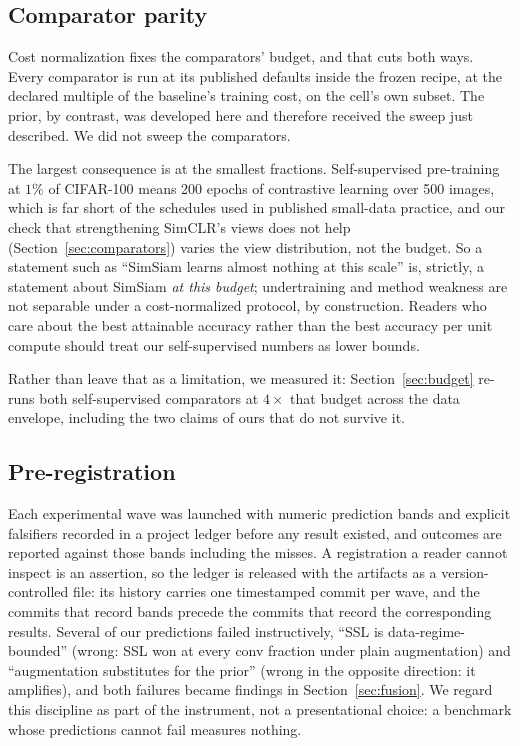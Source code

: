 \subsection{Comparator parity}\label{sec:parity}
Cost normalization fixes the comparators' budget, and that cuts both ways.
Every comparator is run at its published defaults inside the frozen recipe,
at the declared multiple of the baseline's training cost, on the cell's own
subset. The prior, by contrast, was developed here and therefore received
the sweep just described. We did not sweep the comparators.

The largest consequence is at the smallest fractions. Self-supervised
pre-training at $1\%$ of CIFAR-100 means 200 epochs of contrastive learning
over 500 images, which is far short of the schedules used in published
small-data practice, and our check that strengthening SimCLR's views does
not help (Section~\ref{sec:comparators}) varies the view distribution, not
the budget. So a statement such as ``SimSiam learns almost nothing at this
scale'' is, strictly, a statement about SimSiam \emph{at this budget};
undertraining and method weakness are not separable under a cost-normalized
protocol, by construction. Readers who care about the best attainable
accuracy rather than the best accuracy per unit compute should treat our
self-supervised numbers as lower bounds.

Rather than leave that as a limitation, we measured it:
Section~\ref{sec:budget} re-runs both self-supervised comparators at $4\times$
that budget across the data envelope, including the two claims of ours that do
not survive it.

\subsection{Pre-registration}\label{sec:prereg}
Each experimental wave was launched with numeric prediction bands and
explicit falsifiers recorded in a project ledger before any result existed,
and outcomes are reported against those bands including the misses. A
registration a reader cannot inspect is an assertion, so the ledger is
released with the artifacts as a version-controlled file: its history carries
one timestamped commit per wave, and the commits that record bands precede the
commits that record the corresponding results. Several of our predictions failed instructively, ``SSL is
data-regime-bounded'' (wrong: SSL won at every conv fraction under plain
augmentation) and ``augmentation substitutes for the prior'' (wrong in
the opposite direction: it amplifies), and both failures became
findings in Section~\ref{sec:fusion}.  We regard this discipline as part of the instrument, not a presentational choice: a benchmark whose predictions cannot fail measures nothing.

